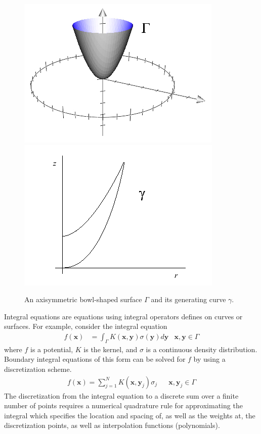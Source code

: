 \documentclass[11pt, oneside]{article}   	%
\begin{document}
\begin{figure}[h]
\caption{An axisymmetric bowl-shaped surface $\Gamma$ and its generating curve $\gamma$.}
\label{fig:1}
\centering
\includegraphics[scale=0.5]{./images/bowl3}
\includegraphics[scale=0.5]{./images/bowl}
\end{figure}

Integral equations are equations using integral operators defines on curves or surfaces. For example, consider the integral equation
\begin{align}
f(\mathbf{x}) &= \int_\Gamma K(\mathbf{x},\mathbf{y})\sigma(\mathbf{y})d\mathbf{y} &\mathbf{x},\mathbf{y}\in\Gamma
\end{align}
where $f$ is a potential, $K$ is the kernel, and $\sigma$ is a continuous density distribution. Boundary integral equations of this form can be solved for $f$ by using a discretization scheme.
\begin{align}
f(\mathbf{x}) = \sum_{j=1}^N K(\mathbf{x},\mathbf{y}_j)\sigma_j &&\mathbf{x},\mathbf{y}_j\in\Gamma
\end{align}
The discretization from the integral equation to a discrete sum over a finite number of points requires a numerical quadrature rule for approximating the integral which specifies the location and spacing of, as well as the weights at, the discretization points, as well as interpolation functions (polynomials).
\end{document}

